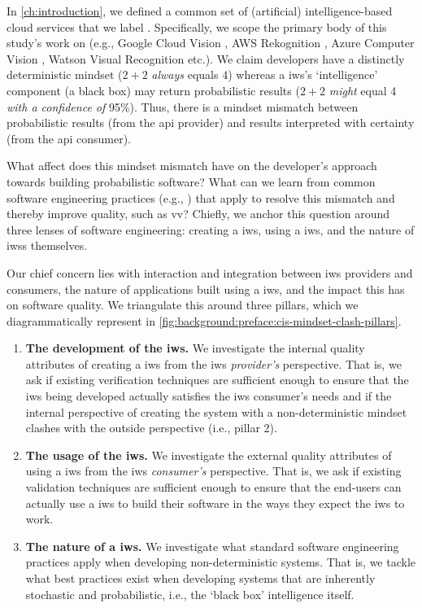 \label{sec:background:preface}

In \cref{ch:introduction}, we defined a common set of (artificial) intelligence-based cloud services that we label . Specifically, we scope the primary body of this study's work on  (e.g., Google Cloud Vision \citep{GoogleCloud:Home}, AWS Rekognition \citep{AWS:Home}, Azure Computer Vision \citep{Azure:Home}, Watson Visual Recognition \citep{IBM:Home} etc.). We claim developers have a distinctly deterministic mindset ($2+2$ \textit{always}  equals 4) whereas a \gls{iws}'s `intelligence' component (a black box) may return probabilistic results ($2+2$ \textit{might} equal 4 \textit{with a confidence of} 95\%). Thus, there is a mindset mismatch between probabilistic results (from the \gls{api} provider) and results interpreted with certainty (from the \gls{api} consumer).

What affect does this mindset mismatch have on the developer's approach towards building probabilistic software? What can we learn from common software engineering practices (e.g., \citep{Pressman:2005vf,Sommerville:2011uc}) that apply to resolve this mismatch and thereby improve quality, such as \gls{vv}? Chiefly, we anchor this question around three lenses of software engineering: creating a \gls{iws}, using a \gls{iws}, and the nature of \glspl{iws} themselves.

Our chief concern lies with interaction and integration between \gls{iws} providers and consumers, the nature of applications built using a \gls{iws}, and the impact this has on software quality. We triangulate this around three pillars, which we diagrammatically represent in \cref{fig:background:preface:cis-mindset-clash-pillars}.
 
\begin{enumerate}[label=\textbf{(\arabic*})]
\item \textbf{The development of the \gls{iws}.} We investigate the internal quality attributes of creating a \gls{iws} from the \gls{iws} \textit{provider's} perspective. That is, we ask if existing verification techniques are sufficient enough to ensure that the \gls{iws} being developed actually satisfies the \gls{iws} consumer's needs and if the internal perspective of creating the system with a non-deterministic mindset clashes with the outside perspective (i.e., pillar 2).
\item \textbf{The usage of the \gls{iws}.} We investigate the external quality attributes of using a \gls{iws} from the \gls{iws} \textit{consumer's} perspective. That is, we ask if existing validation techniques are sufficient enough to ensure that the end-users can actually use a \gls{iws} to build their software in the ways they expect the \gls{iws} to work.
\item \textbf{The nature of a \gls{iws}.} We investigate what standard software engineering practices apply when developing non-deterministic systems. That is, we tackle what best practices exist when developing systems that are inherently stochastic and probabilistic, i.e., the `black box' intelligence itself.
\end{enumerate}

